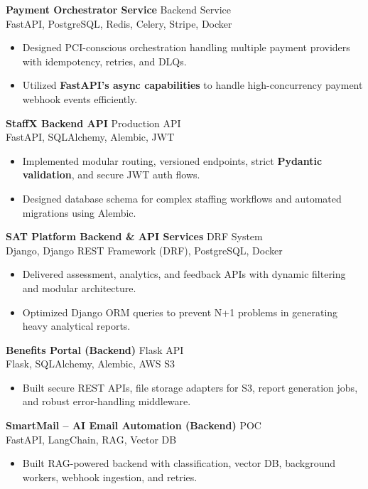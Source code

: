 \documentclass[11pt]{article}
\begin{document}
\textbf{Payment Orchestrator Service} \hfill Backend Service \\
FastAPI, PostgreSQL, Redis, Celery, Stripe, Docker
\begin{itemize}
    \item Designed PCI-conscious orchestration handling multiple payment providers with idempotency, retries, and DLQs.
    \item Utilized \textbf{FastAPI's async capabilities} to handle high-concurrency payment webhook events efficiently.
\end{itemize}

\textbf{StaffX Backend API} \hfill Production API \\
FastAPI, SQLAlchemy, Alembic, JWT
\begin{itemize}
    \item Implemented modular routing, versioned endpoints, strict \textbf{Pydantic validation}, and secure JWT auth flows.
    \item Designed database schema for complex staffing workflows and automated migrations using Alembic.
\end{itemize}

\textbf{SAT Platform Backend \& API Services} \hfill DRF System \\
Django, Django REST Framework (DRF), PostgreSQL, Docker
\begin{itemize}
    \item Delivered assessment, analytics, and feedback APIs with dynamic filtering and modular architecture.
    \item Optimized Django ORM queries to prevent N+1 problems in generating heavy analytical reports.
\end{itemize}

\textbf{Benefits Portal (Backend)} \hfill Flask API \\
Flask, SQLAlchemy, Alembic, AWS S3
\begin{itemize}
    \item Built secure REST APIs, file storage adapters for S3, report generation jobs, and robust error-handling middleware.
\end{itemize}

\textbf{SmartMail – AI Email Automation (Backend)} \hfill POC \\
FastAPI, LangChain, RAG, Vector DB
\begin{itemize}
    \item Built RAG-powered backend with classification, vector DB, background workers, webhook ingestion, and retries.
\end{itemize}
\end{document}
